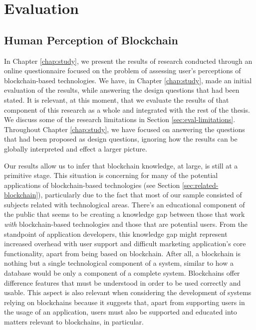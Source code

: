 \chapter{Evaluation}
\label{chap:evaluation}

\section{Human Perception of Blockchain}

In Chapter \ref{chap:study}, we present the results of research conducted through an online questionnaire focused on the problem of assessing user's perceptions of blockchain-based technologies. We have, in Chapter \ref{chap:study}, made an initial evaluation of the results, while answering the design questions that had been stated. It is relevant, at this moment, that we evaluate the results of that component of this research as a whole and integrated with the rest of the thesis. We discuss some of the research limitations in Section \ref{sec:eval-limitations}. Throughout Chapter \ref{chap:study}, we have focused on answering the questions that had been proposed as design questions, ignoring how the results can be globally interpreted and effect a larger picture.

Our results allow us to infer that blockchain knowledge, at large, is still at a primitive stage. This situation is concerning for many of the potential applications of blockchain-based technologies (see Section \ref{sec:related-blockchain}), particularly due to the fact that most of our sample consisted of subjects related with technological areas. There's an educational component of the public that seems to be creating a knowledge gap between those that work \emph{with} blockchain-based technologies and those that are potential users. From the standpoint of application developers, this knowledge gap might represent increased overhead with user support and difficult marketing application's core functionality, apart from being based on blockchain. After all, a blockchain is nothing but a single technological component of a system, similar to how a database would be only a component of a complete system. Blockchains offer difference features that must be understood in order to be used correctly and usable. This aspect is also relevant when considering the development of systems relying on blockchains because it suggests that, apart from supporting users in the usage of an application, users must also be supported and educated into matters relevant to blockchains, in particular.

